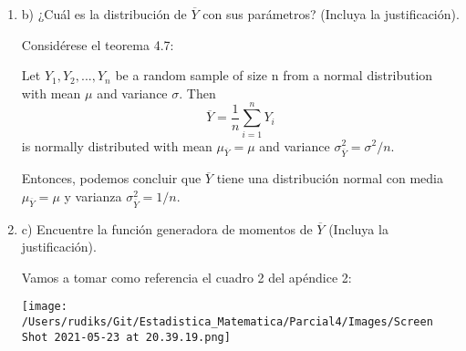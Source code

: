 \begin{enumerate}
\begin{solution}
\begin{align*}
			&= \frac{1}{\sigma^n\left(\sqrt{2\pi}\right)^n}\times \exp\left[-\frac{1}{2\sigma^2}\left(\sum_{i=1}^{n}y^2_i-2\sum_{i=1}^{n}y_i\mu+\sum_{i=1}^{n}\mu^2\right)\right]\\
			&= \frac{1}{\sigma^n\left(\sqrt{2\pi}\right)^n}\times \exp\left[-\frac{1}{2\sigma^2}\left(\sum_{i=1}^{n}y^2_i-2n\overline{y}\mu+n\mu^2\right)\right]
			\intertext{Se conocía que $\sigma^2$=1, por lo cual:}
			&= \frac{1}{\left(\sqrt{2\pi}\right)^n}\times \exp\left[-\frac{1}{2}\left(\sum_{i=1}^{n}y^2_i-2n\overline{y}\mu+n\mu^2\right)\right]\\
			&= \frac{1}{\left(\sqrt{2\pi}\right)^n}\times \exp\left[-\frac{1}{2}\sum_{i=1}^{n}y^2_i+\frac{1}{2}2n\overline{y}\mu-\frac{1}{2}n\mu^2\right]\\
			&= \left\{\frac{1}{\left(\sqrt{2\pi}\right)^n}\times \exp\left[-\frac{1}{2}\sum_{i=1}^{n}y^2_i\right]\right\}\times\exp\left[n\overline{y}\mu-\frac{1}{2}n\mu^2\right]\\
			&= h(y)\times g(\overline{y},\mu)
			\end{align*}
		Por lo tanto, $\overline{y}$ es un estimador suficiente para $\mu$.
	\end{solution}
	\item b) ¿Cuál es la distribución de $\overline{Y}$ con sus parámetros? (Incluya la justificación).
	\begin{solution}
		Considérese el teorema 4.7:
		\begin{tcolorbox}[colback=gray!15,colframe=black!1!black,title=Teorema 7.1 ]
			Let $Y_1, Y_2, . . . , Y_n$ be a random sample of size n from a normal distribution 
			with mean $\mu$ and variance $\sigma$. Then
			$$\overline{Y}=\frac{1}{n}\sum_{i=1}^{n}Y_i$$
			is normally distributed with mean $\mu_{\overline{Y}} = \mu$ and variance $\sigma^2_{\overline{Y}} = \sigma^2/n$.
		\end{tcolorbox}
Entonces, podemos concluir que $\overline{Y}$ tiene una distribución normal con media $\mu_{\overline{Y}} = \mu$ y varianza $\sigma^2_{\overline{Y}} = 1/n$.
	\end{solution}
	\item c) Encuentre la función generadora de momentos de $\overline{Y}$ (Incluya la justificación).
	\begin{solution}
		Vamos a tomar como referencia el cuadro 2 del apéndice 2: 
		\begin{center}
			\texttt{[image: /Users/rudiks/Git/Estadistica\_Matematica/Parcial4/Images/Screen Shot 2021-05-23 at 20.39.19.png]}
		\end{center}

\end{solution}
\end{enumerate}
